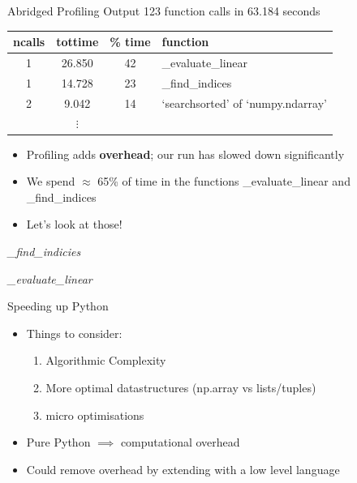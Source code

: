\documentclass[12pt,xcolor=dvipsnames]{beamer}
\begin{document}
    \begin{frame}{Abridged Profiling Output}
        123 function calls in 63.184 seconds
        \begin{center}
        \begin{tabular}{ | c | c | c | l |}
            \hline
            ncalls & tottime & \% time & function \\
            \hline
            1 & 26.850 & 42 & \_evaluate\_linear \\
            1 & 14.728 & 23 & \_find\_indices \\
            2 & 9.042 & 14 & `searchsorted' of `numpy.ndarray' \\
            & $\vdots$ & & \\
            \hline
        \end{tabular}
        \end{center}
        \begin{itemize}
            \item<2-> Profiling adds \textbf{overhead}; our run has slowed down significantly
            \item<2-> We spend $\approx$ 65\% of time in the functions \_evaluate\_linear and \_find\_indices
            \item<2-> Let's look at those!
        \end{itemize}
    \end{frame}

    \begin{frame}{\textit{\_find\_indicies}}
        
    \end{frame}

    \begin{frame}{\textit{\_evaluate\_linear}}
        
    \end{frame}

    \begin{frame}{Speeding up Python}
        \begin{itemize}
            \item Things to consider:
            \begin{enumerate}
                \item Algorithmic Complexity
                \item More optimal datastructures (np.array vs lists/tuples)
                \item micro optimisations
            \end{enumerate}
            \item Pure Python $\implies$ computational overhead
            \item Could remove overhead by extending with a low level language
        \end{itemize}
    \end{frame}
\end{document}
